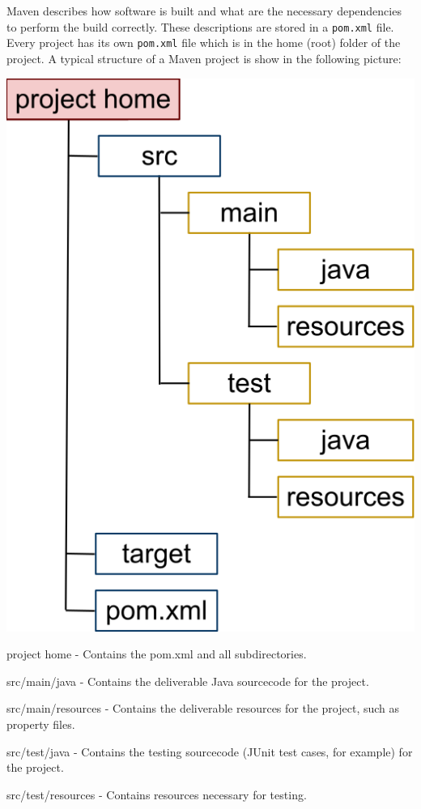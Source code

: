 \documentclass{article}
\begin{document}
Maven describes how software is built and what are the necessary
dependencies to perform the build correctly. These descriptions are
stored in a \texttt{pom.xml} file. Every project has its own
\texttt{pom.xml} file which is in the home (root) folder of the
project.
A typical structure of a Maven project is show in the following picture:
\begin{center}
\includegraphics[scale=0.3]{figures/1}
\end{center}
\begin{compactitem}
\item project home	- Contains the pom.xml and all subdirectories.
\item src/main/java - Contains the deliverable Java sourcecode for the project.
\item src/main/resources - Contains the deliverable resources for the project, such as property files.
\item src/test/java - Contains the testing sourcecode (JUnit test cases, for example) for the project.
\item src/test/resources - Contains resources necessary for testing.
\end{compactitem}
\end{document}

